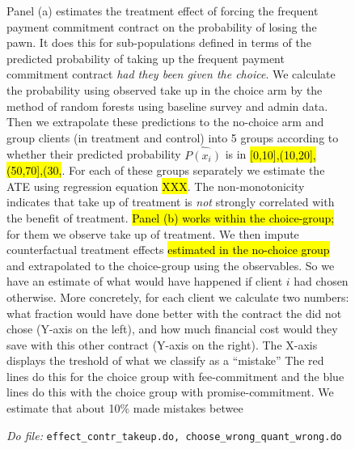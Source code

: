 \documentclass[11pt]{article}
\begin{document}
\begin{figure}[H]
             \scriptsize
             Panel (a) estimates the treatment effect of forcing the frequent payment commitment contract on the probability of losing the pawn. It does this for sub-populations defined in terms of the predicted probability of taking up the frequent payment commitment contract \textit{had they been given the choice}. We calculate the probability using observed take up in the choice arm by the method of random forests using baseline survey and admin data. Then we extrapolate these predictions to the no-choice arm and group clients (in treatment and control) into 5 groups according to whether their predicted probability $\hat{P(x_i)}$ is in \hl{[0,10],(10,20],(50,70],(30,}. For each of these groups separately we estimate the ATE using regression equation \hl{XXX}.  The non-monotonicity indicates that take up of treatment is \textit{not} strongly correlated with the benefit of treatment. \hl{Panel (b) works within the choice-group;} for them we observe take up of treatment. We then impute counterfactual treatment effects \hl{estimated in the no-choice group} and extrapolated to the choice-group using the observables. So we have an estimate of what would have happened if client $i$ had chosen otherwise. More concretely, for each client we calculate two numbers: what fraction would have done better with the contract the did not chose (Y-axis on the left), and how much financial cost would they save with this other contract (Y-axis on the right). The X-axis displays the treshold of what we classify as a ``mistake'' The red lines do this for the choice group with fee-commitment and the blue lines do this with the choice group with promise-commitment. We estimate that about 10\% made mistakes betwee
             
             \textit{Do file: }  \texttt{effect\_contr\_takeup.do, choose\_wrong\_quant\_wrong.do}
\end{figure}
\end{document}

